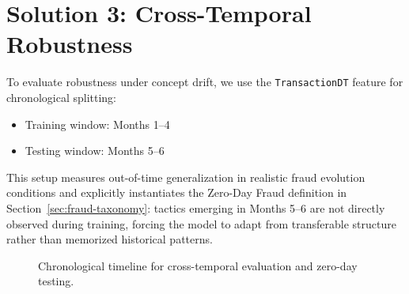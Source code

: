 \documentclass[12pt,a4paper]{report}
\begin{document}
\section{Solution 3: Cross-Temporal Robustness}
To evaluate robustness under concept drift, we use the \texttt{TransactionDT} feature for chronological splitting:
\begin{itemize}
    \item Training window: Months 1--4
    \item Testing window: Months 5--6
\end{itemize}
This setup measures out-of-time generalization in realistic fraud evolution conditions and explicitly instantiates the Zero-Day Fraud definition in Section~\ref{sec:fraud-taxonomy}: tactics emerging in Months 5--6 are not directly observed during training, forcing the model to adapt from transferable structure rather than memorized historical patterns.

\begin{figure}[htbp]
\centering
{}
\caption{Chronological timeline for cross-temporal evaluation and zero-day testing.}
\label{fig:chronological-split}
\end{figure}
\end{document}
